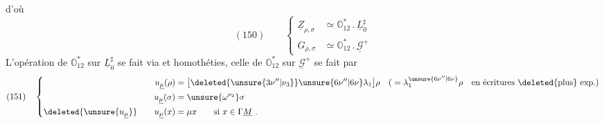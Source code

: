 d'où
\[
(150)\qquad
\left\{\begin{aligned}
\underline Z_{\rho,\sigma}&\simeq\mathbb O_{12}^{*}\mathbin{.}\underline L_0^{\sharp}\\
G_{\rho,\sigma}&\simeq\mathbb O_{12}^{*}\mathbin{.}\underline{\mathcal G}^{+}
\end{aligned}\right.
\]
L'opération de \(\mathbb O_{12}^{*}\) sur \(\underline L_0^{\sharp}\) se fait
via
et homothéties, celle
de \(\mathbb O_{12}^{*}\) sur \(\underline{\mathcal G}^{+}\) se fait par
\[
(151)\quad
\left\{\begin{aligned}
u_{\underline\mu}(\rho)&=\bigl[\deleted{\unsure{3\nu''|\nu_3}}\unsure{6\nu''|6\nu}\lambda_1\bigr]\rho
\quad\text{(}=\lambda_1^{\unsure{6\nu''|6\nu}}\rho\quad\text{en écritures \deleted{plus} exp.}\text{)}\\
u_{\underline\mu}(\sigma)&=\unsure{\omega^{\nu_2}}\sigma\\
\deleted{\unsure{u_{\underline\mu}}}\qquad u_{\underline\mu}(x)&=\mu x\qquad\text{si }x\in\Gamma\underline M\ .
\end{aligned}\right.
\]
